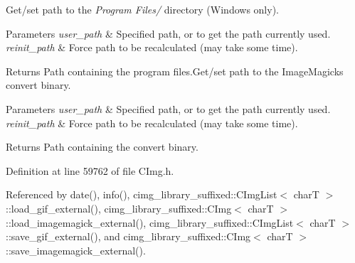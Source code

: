 Get/set path to the {\itshape Program Files/} directory (Windows only). 


\begin{DoxyParams}{Parameters}
{\em user\+\_\+path} & Specified path, or {} to get the path currently used. \\
\hline
{\em reinit\+\_\+path} & Force path to be recalculated (may take some time). \\
\hline
\end{DoxyParams}
\begin{DoxyReturn}{Returns}
Path containing the program files.\+Get/set path to the Image\+Magick\textquotesingle{}s {\ttfamily convert} binary. 
\end{DoxyReturn}

\begin{DoxyParams}{Parameters}
{\em user\+\_\+path} & Specified path, or {} to get the path currently used. \\
\hline
{\em reinit\+\_\+path} & Force path to be recalculated (may take some time). \\
\hline
\end{DoxyParams}
\begin{DoxyReturn}{Returns}
Path containing the {\ttfamily convert} binary. 
\end{DoxyReturn}


Definition at line 59762 of file C\+Img.\+h.



Referenced by date(), info(), cimg\+\_\+library\+\_\+suffixed\+::\+C\+Img\+List$<$ char\+T $>$\+::load\+\_\+gif\+\_\+external(), cimg\+\_\+library\+\_\+suffixed\+::\+C\+Img$<$ char\+T $>$\+::load\+\_\+imagemagick\+\_\+external(), cimg\+\_\+library\+\_\+suffixed\+::\+C\+Img\+List$<$ char\+T $>$\+::save\+\_\+gif\+\_\+external(), and cimg\+\_\+library\+\_\+suffixed\+::\+C\+Img$<$ char\+T $>$\+::save\+\_\+imagemagick\+\_\+external().

